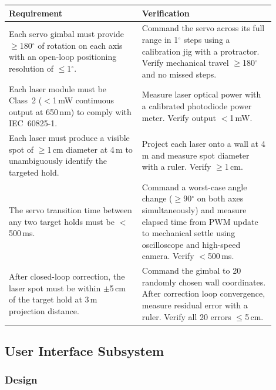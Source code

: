 \documentclass[12pt]{extarticle}
\begin{document}
\begin{longtable}{>{\raggedright\arraybackslash}p{0.45\linewidth}
                  >{\raggedright\arraybackslash}p{0.45\linewidth}}
\toprule
\textbf{Requirement} & \textbf{Verification} \\
\midrule
\endhead
\bottomrule
\endfoot

Each servo gimbal must provide $\geq$180$^\circ$ of rotation on each axis with an open-loop
positioning resolution of $\leq$1$^\circ$. &
Command the servo across its full range in 1$^\circ$ steps using a calibration jig with a
protractor. Verify mechanical travel $\geq$180$^\circ$ and no missed steps. \\
\addlinespace

Each laser module must be Class~2 ($<$1\,mW continuous output at 650\,nm) to comply with
IEC~60825-1. &
Measure laser optical power with a calibrated photodiode power meter. Verify output
$<$1\,mW. \\
\addlinespace

Each laser must produce a visible spot of $\geq$1\,cm diameter at 4\,m to unambiguously
identify the targeted hold. &
Project each laser onto a wall at 4\,m and measure spot diameter with a ruler. Verify
$\geq$1\,cm. \\
\addlinespace

The servo transition time between any two target holds must be $<$500\,ms. &
Command a worst-case angle change ($\geq$90$^\circ$ on both axes simultaneously) and measure
elapsed time from PWM update to mechanical settle using oscilloscope and high-speed camera.
Verify $<$500\,ms. \\
\addlinespace

After closed-loop correction, the laser spot must be within $\pm$5\,cm of the target hold at
3\,m projection distance. &
Command the gimbal to 20 randomly chosen wall coordinates. After correction loop convergence,
measure residual error with a ruler. Verify all 20 errors $\leq$5\,cm. \\
\end{longtable}

\subsection{User Interface Subsystem}

\subsubsection{Design}
\end{document}
